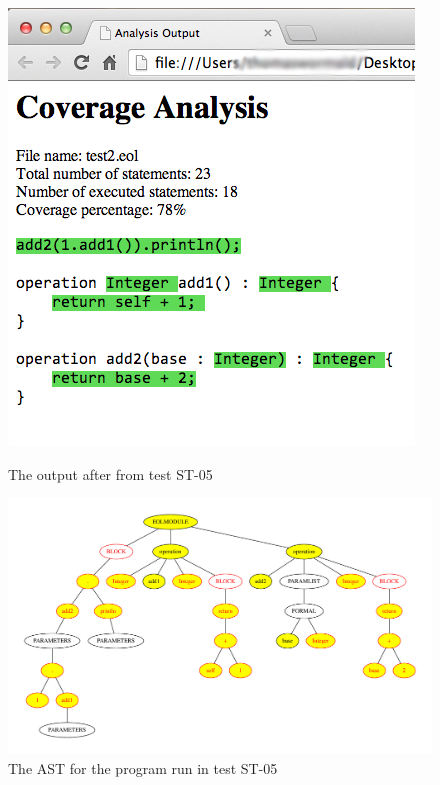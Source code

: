 \begin{figure}
\centering
\begin{minipage}{.5\textwidth}
  \centering
  \includegraphics[width=0.6\linewidth]{figures/ST05HTML.png}
  \caption{The output after from test ST-05}
  \label{fig:ST05HTML}
\end{minipage}%
\begin{minipage}{.5\textwidth}
  \centering
  \includegraphics[width=\linewidth]{figures/ST05AST.pdf}
  \caption{The AST for the program run in test ST-05}
  \label{fig:ST05AST}
\end{minipage}
\end{figure}
